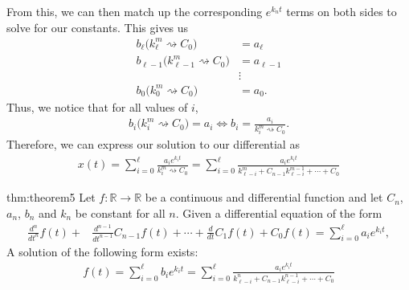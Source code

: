 From this, we can then match up the corresponding $e^{k_nt}$ terms on both sides to solve for our constants. This gives us
\begin{align}
b_{\ell}\big( k_{\ell}^m\rightsquigarrow C_0\big) &= a_\ell \\
b_{\ell-1}\big( k_{\ell-1}^m \rightsquigarrow C_0\big) &= a_{\ell-1} \\
&\vdots \\
b_{0}\big( k_{0}^m \rightsquigarrow C_0\big) &= a_0.
\end{align}
Thus, we notice that for all values of $i$,
\begin{align}
b_{i}\big( k_{i}^m \rightsquigarrow C_0\big) = a_i \Longleftrightarrow b_{i}=\frac{a_i}{k_{i}^m \rightsquigarrow C_0} .
\end{align}
Therefore, we can express our solution to our differential as
\begin{align}
x(t)=\sum_{i=0}^{\ell}\frac{a_ie^{k_it}}{k_{i}^m \rightsquigarrow C_0} = \sum_{i=0}^{\ell}\frac{a_ie^{k_it}}{k_{\ell-i}^m +C_{n-1} k_{\ell-i}^{m-1} +\cdots+C_0} 
\end{align}








\begin{theo}{thm:theorem5}
Let $f:\mathbb{R}\rightarrow\mathbb{R}$ be a continuous and differential function and let $C_n$, $a_n$, $b_n$ and $k_n$ be constant for all $n$. Given a differential equation of the form
\begin{align*}
\frac{d^n}{dt^n}f(t)+&\frac{d^{n-1}}{dt^{n-1}}C_{n-1}f(t)+\cdots+\frac{d}{dt}C_1f(t)+C_0f(t)=\sum_{i=0}^{\ell}a_i e^{k_i t},
\end{align*}
A solution of the following form exists:
\begin{align*}
f(t)=\sum_{i=0}^{\ell}b_i e^{k_i t}=\sum_{i=0}^{\ell}\frac{a_ie^{k_it}}{k_{\ell-i}^n +C_{n-1} k_{\ell-i}^{n-1} +\cdots+C_0} 
\end{align*}
\end{theo}